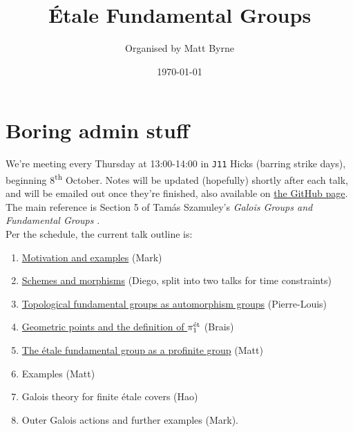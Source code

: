 \documentclass{article}
\title{\vspace{-1.5cm}\'Etale Fundamental Groups}
\author{Organised by Matt Byrne}
\date{\today}
\begin{document}
	\maketitle

	\tableofcontents

	\section*{Boring admin stuff}
	We're meeting every Thursday at 13:00-14:00 in \texttt{J11} Hicks (barring strike days), beginning 8\textsuperscript{th} October. Notes will be updated (hopefully) shortly after each talk, and will be emailed out once they're finished, also available on \href{https://github.com/MLByrne232/Etale-fund-gps-notes}{the GitHub page}. The main reference is Section 5 of Tam\'as Szamuley's \emph{Galois Groups and Fundamental Groups} \cite{szamuely09}.\\

	Per the schedule, the current talk outline is:
	\begin{enumerate}
		\item \hyperref[sec:1_motivation_mark]{Motivation and examples} (Mark)
		\item \hyperref[sec:2_schemes_and_morphisms]{Schemes and morphisms} (Diego, split into two talks for time constraints)
		\item \hyperref[sec:3_pi_1_as_Aut(Fib)]{Topological fundamental groups as automorphism groups} (Pierre-Louis)
		\item \hyperref[sec:4_efg]{Geometric points and the definition of $\pi_1^{\mathrm{\acute{e}t}}$} (Brais)
		\item \hyperref[sec:5_pro_objects]{The \'etale fundamental group as a profinite group} (Matt)
		\item Examples (Matt)
		\item Galois theory for finite \'etale covers (Hao)
		\item Outer Galois actions and further examples (Mark).
	\end{enumerate}


	\appendix

	
	
\end{document}
